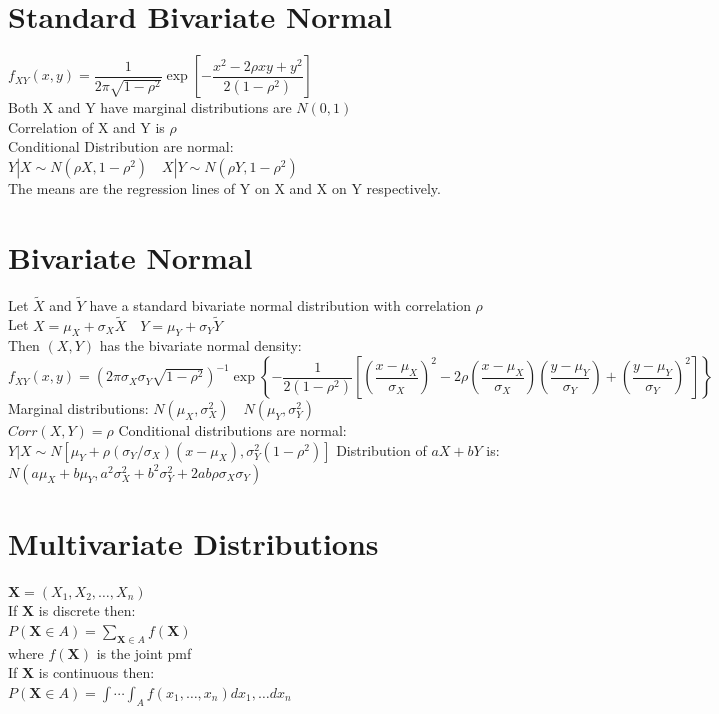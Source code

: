 \documentclass[openany]{book}
\begin{document}
\section{Standard Bivariate Normal}
$f_{XY}(x,y)=\dfrac{1}{2\pi\sqrt{1-\rho^2}}\exp{\left[-\dfrac{x^2-2\rho xy+y^2}{2(1-\rho^2)}\right]}$\\
Both X and Y have marginal distributions are $N(0,1)$\\
Correlation of X and Y is $\rho$\\
Conditional Distribution are normal:\\
$Y|X \sim N(\rho X,1-\rho^2) \quad X|Y \sim N(\rho Y, 1-\rho^2)$\\
The means are the regression lines of Y on X and X on Y respectively.
\section{Bivariate Normal}
Let $\tilde{X}$ and $\tilde{Y}$ have a standard bivariate normal distribution with correlation $\rho$\\
Let $X=\mu_X+\sigma_X\tilde{X} \quad Y=\mu_Y+\sigma_Y\tilde{Y}$\\
Then $(X,Y)$ has the bivariate normal density:\\
$f_{XY}(x,y)=\left(2\pi \sigma_X \sigma_Y \sqrt{1-\rho^2} \right)^{-1}\exp{\left\{-\dfrac{1}{2(1-\rho^2)}\left[\left(\dfrac{x-\mu_X}{\sigma_X} \right)^2- 2\rho \left(\dfrac{x-\mu_X}{\sigma_X} \right)\left(\dfrac{y-\mu_Y}{\sigma_Y} \right)+\left(\dfrac{y-\mu_Y}{\sigma_Y} \right)^2 \right] \right\}}$\medbreak
Marginal distributions: $N(\mu_X,\sigma^2_X) \quad N(\mu_Y,\sigma^2_Y)$\\
$Corr(X,Y)=\rho$\medbreak
Conditional distributions are normal:\\
$Y|X \sim N[\mu_Y+\rho(\sigma_Y/\sigma_X)(x-\mu_X),\sigma^2_Y(1-\rho^2)]$\medbreak
Distribution of $aX+bY$ is:\\
$N(a\mu_X+b\mu_Y,a^2\sigma^2_X+b^2\sigma^2_Y+2ab\rho \sigma_X \sigma_Y)$
\section{Multivariate Distributions}
$\boldsymbol{X}=(X_1,X_2,\dots, X_n)$\\
If $\boldsymbol{X}$ is discrete then:\\
$P(\boldsymbol{X} \in A)=\sum_{\boldsymbol{X} \in A} f(\boldsymbol{X})$\\
where $f(\boldsymbol{X})$ is the joint pmf\\
If $\boldsymbol{X}$ is continuous then:\\
$P(\boldsymbol{X}\in A)=\int \cdots \int_{A}f(x_1,\dots,x_n)dx_1,\dots dx_n$\medbreak
\end{document}

